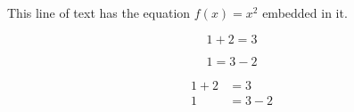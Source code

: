 \documentclass{article}
\begin{document}
This line of text has the equation $f(x) = x^2$ embedded in it.

\begin{equation*}
  1 + 2 = 3
\end{equation*}

\begin{equation*}
  1 = 3 - 2
\end{equation*}

\begin{align*}
  1 + 2 &= 3\\
  1 &= 3 - 2
\end{align*}
\end{document}

